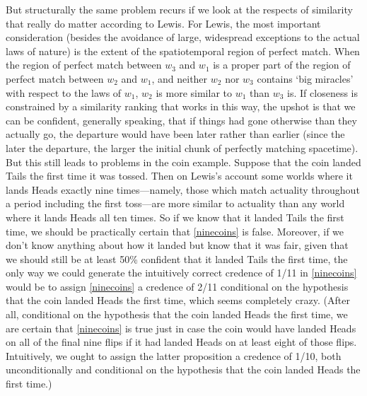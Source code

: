 \documentclass[If.tex]{subfiles}
\begin{document}
But structurally the same problem recurs if we look at the respects of similarity that really do matter according to Lewis. For Lewis, the most important consideration (besides the avoidance of large, widespread exceptions to the actual laws of nature) is the extent of the spatiotemporal region of perfect match. When the region of perfect match between $w_3$ and $w_1$ is a proper part of the region of perfect match between $w_2$ and $w_1$, and neither $w_2$ nor $w_3$ contains ‘big miracles’ with respect to the laws of $w_1$, $w_2$ is more similar to $w_1$ than $w_3$ is. If closeness is constrained by a similarity ranking that works in this way, the upshot is that we can be confident, generally speaking, that if things had gone otherwise than they actually go, the departure would have been later rather than earlier (since the later the departure, the larger the initial chunk of perfectly matching spacetime). But this still leads to problems in the coin example. Suppose that the coin landed Tails the first time it was tossed. Then on Lewis's account some worlds where it lands Heads exactly nine times---namely, those which match actuality throughout a period including the first toss---are more similar to actuality than any world where it lands Heads all ten times. So if we know that it landed Tails the first time, we should be practically certain that \ref{ninecoins} is false. Moreover, if we don't know anything about how it landed but know that it was fair, given that we should still be at least 50\% confident that it landed Tails the first time, the only way we could generate the intuitively correct credence of 1/11 in \ref{ninecoins} would be to assign \ref{ninecoins} a credence of 2/11 conditional on the hypothesis that the coin landed Heads the first time, which seems completely crazy. (After all, conditional on the hypothesis that the coin landed Heads the first time, we are certain that \ref{ninecoins} is true just in case the coin would have landed Heads on all of the final nine flips if it had landed Heads on at least eight of those flips. Intuitively, we ought to assign the latter proposition a credence of 1/10, both unconditionally and conditional on the hypothesis that the coin landed Heads the first time.)
\end{document}
